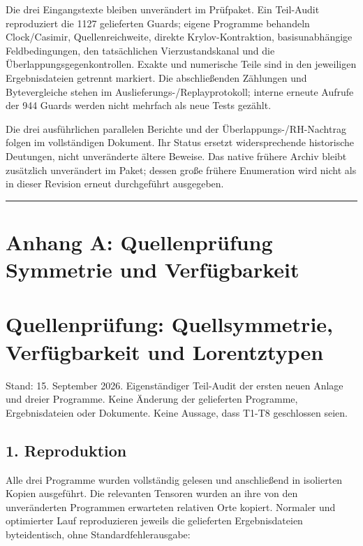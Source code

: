 Die drei Eingangstexte bleiben unverändert im Prüfpaket. Ein Teil-Audit
reproduziert die 1127 gelieferten Guards; eigene Programme behandeln
Clock/Casimir, Quellenreichweite, direkte Krylov-Kontraktion,
basisunabhängige Feldbedingungen, den tatsächlichen Vierzustandskanal
und die Überlappungsgegenkontrollen. Exakte und numerische Teile sind in
den jeweiligen Ergebnisdateien getrennt markiert. Die abschließenden
Zählungen und Bytevergleiche stehen im Auslieferungs-/Replayprotokoll;
interne erneute Aufrufe der 944 Guards werden nicht mehrfach als neue
Tests gezählt.

Die drei ausführlichen parallelen Berichte und der
Überlappungs-/RH-Nachtrag folgen im vollständigen Dokument. Ihr Status
ersetzt widersprechende historische Deutungen, nicht unveränderte ältere
Beweise. Das native frühere Archiv bleibt zusätzlich unverändert im
Paket; dessen große frühere Enumeration wird nicht als in dieser
Revision erneut durchgeführt ausgegeben.

\begin{center}\rule{0.5\linewidth}{0.5pt}\end{center}

\section{Anhang A: Quellenprüfung Symmetrie und
Verfügbarkeit}\label{anhang-a-quellenpruxfcfung-symmetrie-und-verfuxfcgbarkeit}

\section{Quellenprüfung: Quellsymmetrie, Verfügbarkeit und
Lorentztypen}\label{quellenpruxfcfung-quellsymmetrie-verfuxfcgbarkeit-und-lorentztypen}

Stand: 15. September 2026. Eigenständiger Teil-Audit der ersten neuen
Anlage und dreier Programme. Keine Änderung der gelieferten Programme,
Ergebnisdateien oder Dokumente. Keine Aussage, dass T1-T8 geschlossen
seien.

\subsection{1. Reproduktion}\label{reproduktion-1}

Alle drei Programme wurden vollständig gelesen und anschließend in
isolierten Kopien ausgeführt. Die relevanten Tensoren wurden an ihre von
den unveränderten Programmen erwarteten relativen Orte kopiert. Normaler
und optimierter Lauf reproduzieren jeweils die gelieferten
Ergebnisdateien byteidentisch, ohne Standardfehlerausgabe:

